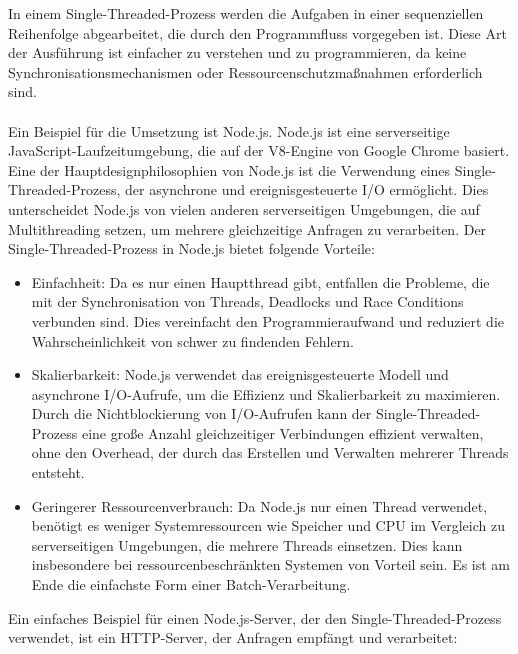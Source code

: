 In einem Single-Threaded-Prozess werden die Aufgaben in einer sequenziellen Reihenfolge abgearbeitet, die durch den Programmfluss vorgegeben ist. Diese Art der Ausführung ist einfacher zu verstehen und zu programmieren, da keine Synchronisationsmechanismen oder Ressourcenschutzmaßnahmen erforderlich sind.\\\\

Ein Beispiel für die Umsetzung ist Node.js. Node.js ist eine serverseitige JavaScript-Laufzeitumgebung, die auf der V8-Engine von Google Chrome basiert. Eine der Hauptdesignphilosophien von Node.js ist die Verwendung eines Single-Threaded-Prozess, der asynchrone und ereignisgesteuerte I/O ermöglicht. Dies unterscheidet Node.js von vielen anderen serverseitigen Umgebungen, die auf Multithreading setzen, um mehrere gleichzeitige Anfragen zu verarbeiten. Der Single-Threaded-Prozess in Node.js bietet folgende Vorteile:
\begin{itemize}
\item Einfachheit: Da es nur einen Hauptthread gibt, entfallen die Probleme, die mit der Synchronisation von Threads, Deadlocks und Race Conditions verbunden sind. Dies vereinfacht den Programmieraufwand und reduziert die Wahrscheinlichkeit von schwer zu findenden Fehlern.
\item Skalierbarkeit: Node.js verwendet das ereignisgesteuerte Modell und asynchrone I/O-Aufrufe, um die Effizienz und Skalierbarkeit zu maximieren. Durch die Nichtblockierung von I/O-Aufrufen kann der Single-Threaded-Prozess eine große Anzahl gleichzeitiger Verbindungen effizient verwalten, ohne den Overhead, der durch das Erstellen und Verwalten mehrerer Threads entsteht.
\item Geringerer Ressourcenverbrauch: Da Node.js nur einen Thread verwendet, benötigt es weniger Systemressourcen wie Speicher und CPU im Vergleich zu serverseitigen Umgebungen, die mehrere Threads einsetzen. Dies kann insbesondere bei ressourcenbeschränkten Systemen von Vorteil sein. Es ist am Ende die einfachste Form einer Batch-Verarbeitung.
\end{itemize}
Ein einfaches Beispiel für einen Node.js-Server, der den Single-Threaded-Prozess verwendet, ist ein HTTP-Server, der Anfragen empfängt und verarbeitet:

